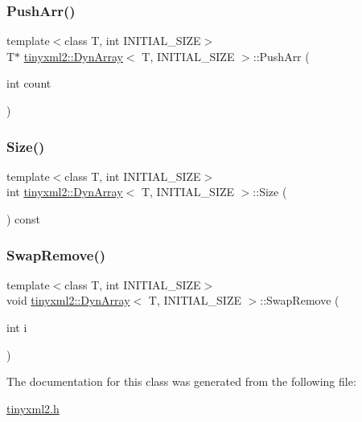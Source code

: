 \mbox{\label{classtinyxml2_1_1_dyn_array_ad289abee8cd02b26e215f1b63d2043f1}} 
\subsubsection{\texorpdfstring{Push\+Arr()}{PushArr()}}
{\footnotesize\ttfamily template$<$class T, int I\+N\+I\+T\+I\+A\+L\+\_\+\+S\+I\+ZE$>$ \\
T$\ast$ \mbox{\hyperlink{classtinyxml2_1_1_dyn_array}{tinyxml2\+::\+Dyn\+Array}}$<$ T, I\+N\+I\+T\+I\+A\+L\+\_\+\+S\+I\+ZE $>$\+::Push\+Arr (\begin{DoxyParamCaption}\item[{int}]{count }\end{DoxyParamCaption})\hspace{0.3cm}{\ttfamily [inline]}}

\mbox{\label{classtinyxml2_1_1_dyn_array_a67614d80847eb92cab330f1a5849a9a2}} 
\subsubsection{\texorpdfstring{Size()}{Size()}}
{\footnotesize\ttfamily template$<$class T, int I\+N\+I\+T\+I\+A\+L\+\_\+\+S\+I\+ZE$>$ \\
int \mbox{\hyperlink{classtinyxml2_1_1_dyn_array}{tinyxml2\+::\+Dyn\+Array}}$<$ T, I\+N\+I\+T\+I\+A\+L\+\_\+\+S\+I\+ZE $>$\+::Size (\begin{DoxyParamCaption}{ }\end{DoxyParamCaption}) const\hspace{0.3cm}{\ttfamily [inline]}}

\mbox{\label{classtinyxml2_1_1_dyn_array_aa72c644f8b5e9ec5dab5b66c88f5665f}} 
\subsubsection{\texorpdfstring{Swap\+Remove()}{SwapRemove()}}
{\footnotesize\ttfamily template$<$class T, int I\+N\+I\+T\+I\+A\+L\+\_\+\+S\+I\+ZE$>$ \\
void \mbox{\hyperlink{classtinyxml2_1_1_dyn_array}{tinyxml2\+::\+Dyn\+Array}}$<$ T, I\+N\+I\+T\+I\+A\+L\+\_\+\+S\+I\+ZE $>$\+::Swap\+Remove (\begin{DoxyParamCaption}\item[{int}]{i }\end{DoxyParamCaption})\hspace{0.3cm}{\ttfamily [inline]}}



The documentation for this class was generated from the following file\+:\begin{DoxyCompactItemize}
\item 
\mbox{\hyperlink{tinyxml2_8h}{tinyxml2.\+h}}\end{DoxyCompactItemize}
